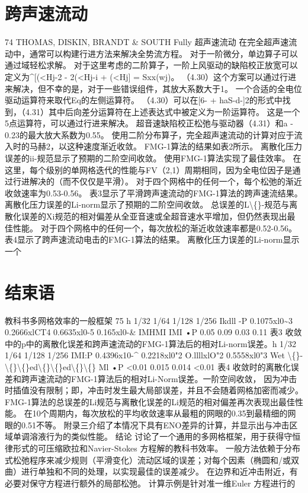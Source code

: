 \documentclass[UTF8,11pt,a4paper,openany,fontset=fandol]{ctexbook}
\begin{document}
\section{跨声速流动}
74 THOMAS, DISKIN, BRANDT \& SOUTH Fully 超声速流动 在完全超声速流动中，通常可以构建行进方法来解决全势流方程。 对于一阶微分，单边算子可以通过域轻松求解。 对于这里考虑的二阶算子，一阶上风驱动的缺陷校正放宽可以定义为\textasciicircum{}[(<Hj-2 - 2(<Hj-i + (<Hj] = Sxx(wj)。 （4.30）这个方案可以通过行进来解决，但不幸的是，对于一些错误组件，其放大系数大于1。 一个合适的全电位驱动运算符来取代Eq的左侧运算符。 （4.30）可以在[6- + haS-d-]2的形式中找到，（4.31）其中后向差分运算符在上述表达式中被定义为一阶运算符。 这是一个5点运算符，可以通过行进来解决。 超音速缺陷校正松弛与驱动器（4.31）和a - 0.23的最大放大系数为0.55。 使用二阶分布算子，完全超声速流动的计算对应于流入时的马赫2，以这种速度渐近收敛。 FMG-1算法的结果如表2所示。 离散化压力误差的ii-规范显示了预期的二阶空间收敛。 使用FMG-1算法实现了最佳效率。 在这里，每个级别的单网格迭代的性能与FV（2,1）周期相同，因为全电位因子是通过行进解决的（而不仅仅是平滑）。 对于四个网格中的任何一个，每个松弛的渐近收敛速率为0.53-0.56。 表3显示了平滑跨声速流动的FMG-1算法的跨声速流结果。 离散化压力误差的Li-norm显示了预期的二阶空间收敛。 总误差的L\textbackslash\{\}-规范与离散化误差的Xi规范的相对偏差从全亚音速或全超音速水平增加，但仍然表现出最佳性能。 对于四个网格中的任何一个，每次放松的渐近收敛速率都是0.52-0.56。 表4显示了跨声速流动电击的FMG-1算法的结果。 离散化压力误差的Li-norm显示一个

\section{结束语}
教科书多网格效率的一般框架 75 h 1/32 1/64 1/128 1/256 Ikdll -P 0.1075xl0\textasciitilde{}3 0.2666xlCT4 0.6635xl0-5 0.165xl0-\& IMHMI IMI •P 0.05 0.09 0.03 0.11 表3 收敛中的p中的离散化误差和跨声速流动的FMG-1算法后的相对Li-norm误差。h 1/32 1/64 1/128 1/256 IMI:P 0.4396x10-\textasciicircum{} 0.2218xl0"2 O.llllxlO"2 0.5558xl0"3 Wet \textbackslash\{\}-\textbackslash\{\}\textbackslash\{\}ed\textbackslash\{\}\textbackslash\{\}ed\textbackslash\{\}\textbackslash\{\} Ml •P <0.01 0.015 0.014 <0.01 表4 收敛时的离散化误差和跨声速流动的FMG-1算法后的相对Li-Norm误差。一阶空间收敛， 因为冲击时插值没有限制；即，冲击时发生最大局部误差，并且不会随着网格加密而减少。 FMG-1算法的总误差的Li规范与离散化误差的Li规范的相对偏差再次表现出最佳性能。 在10个周期内，每次放松的平均收敛速率从最粗的网眼的0.35到最精细的网眼的0.51不等。 附录三介绍了本情况下具有ENO差异的计算，并显示出与冲击区域单调溶液行为的类似性能。 结论 讨论了一个通用的多网格框架，用于获得守恒律形式的可压缩欧拉和Navier-Stokes 方程解的教科书效率。 一般方法依赖于分布式松弛程序来减少规则（平滑变化）流动区域的误差；对每个因素（椭圆和/或双曲）进行单独和不同的处理，以实现最佳的误差减少。 在边界和近冲击附近，有必要对保守方程进行额外的局部松弛。 计算示例是针对准一维Euler 方程进行的
\end{document}
